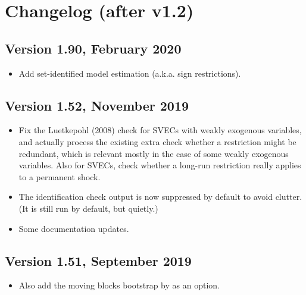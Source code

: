 \documentclass[a4paper,10pt]{article}
\begin{document}
\section{Changelog (after v1.2)}
\label{sec:changelog}

\subsection*{Version 1.90, February 2020}
\begin{itemize}
\item Add set-identified model estimation (a.k.a. sign restrictions).
\end{itemize}

\subsection*{Version 1.52, November 2019}
\begin{itemize}
\item Fix the Luetkepohl (2008) check for SVECs with weakly exogenous variables,
and actually process the existing extra check whether a restriction might be redundant,
which is relevant mostly in the case of some weakly exogenous variables.
Also for SVECs, check whether a long-run restriction really applies to a permanent shock.

\item The identification check output is now suppressed by default to avoid clutter.
(It is still run by default, but quietly.)

\item Some documentation updates.

\end{itemize}


\subsection*{Version 1.51, September 2019}
\begin{itemize}
\item Also add the moving blocks bootstrap by \cite{BrugJenTrenk16} as an option.
\end{itemize}
\end{document}

